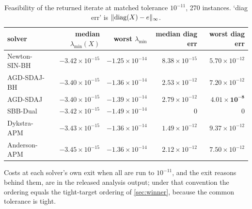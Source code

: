 \begin{table}[t]
\centering
\caption{Feasibility of the returned iterate at matched tolerance $10^{-11}$,
270 instances. `diag err' is $\lVert \operatorname{diag}(X)-e\rVert_\infty$.}
\label{tab:feas}
\small
\begin{tabular}{lrrrr}
\toprule
solver & median $\lambda_{\min}(X)$ & worst $\lambda_{\min}$ & median diag err & worst diag err\\
\midrule
Newton-SIN-BH & $-3.42\times10^{-15}$ & $-1.25\times10^{-14}$ & $8.38\times10^{-15}$ & $5.70\times10^{-12}$\\
AGD-SDAJ-BH   & $-3.40\times10^{-15}$ & $-1.36\times10^{-14}$ & $2.53\times10^{-12}$ & $7.20\times10^{-12}$\\
AGD-SDAJ      & $-3.40\times10^{-15}$ & $-1.39\times10^{-14}$ & $2.79\times10^{-12}$ & $\mathbf{4.01\times10^{-8}}$\\
SBB-Dual      & $-3.42\times10^{-15}$ & $-1.49\times10^{-14}$ & $0$ & $0$\\
Dykstra-APM   & $-3.43\times10^{-15}$ & $-1.36\times10^{-14}$ & $1.49\times10^{-12}$ & $9.37\times10^{-12}$\\
Anderson-APM  & $-3.45\times10^{-15}$ & $-1.36\times10^{-14}$ & $2.12\times10^{-12}$ & $7.50\times10^{-12}$\\
\bottomrule
\end{tabular}
\end{table}

Costs at each solver's own exit when all are run to $10^{-11}$, and the exit
reasons behind them, are in the released analysis output; under that
convention the ordering equals the tight-target ordering of
\cref{sec:winner}, because the common tolerance is tight.

